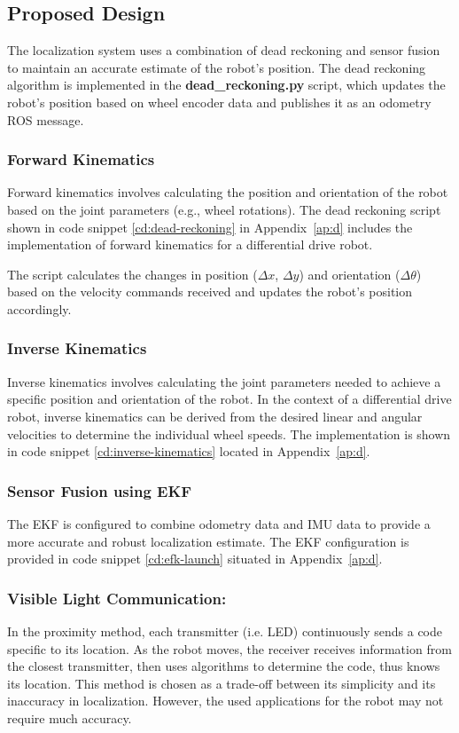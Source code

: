 \subsection{Proposed Design}
The localization system uses a combination of dead reckoning and sensor fusion to maintain an accurate estimate of the robot's position. The dead reckoning algorithm is implemented in the \textbf{dead\_reckoning.py} script, which updates the robot's position based on wheel encoder data and publishes it as an odometry ROS message.

\subsubsection{Forward Kinematics}
Forward kinematics involves calculating the position and orientation of the robot based on the joint parameters (e.g., wheel rotations). The dead reckoning script shown in code snippet \ref{cd:dead-reckoning} in Appendix~\ref{ap:d} includes the implementation of forward kinematics for a differential drive robot.


The script calculates the changes in position ($\Delta x$, $\Delta y$) and orientation ($\Delta \theta$) based on the velocity commands received and updates the robot's position accordingly.

\subsubsection{Inverse Kinematics}
Inverse kinematics involves calculating the joint parameters needed to achieve a specific position and orientation of the robot. In the context of a differential drive robot, inverse kinematics can be derived from the desired linear and angular velocities to determine the individual wheel speeds. The implementation is shown in code snippet \ref{cd:inverse-kinematics} located in Appendix~\ref{ap:d}.


\subsubsection{Sensor Fusion using EKF}
The EKF is configured to combine odometry data and IMU data to provide a more accurate and robust localization estimate. The EKF configuration is provided in code snippet \ref{cd:efk-launch} situated in Appendix~\ref{ap:d}.

\subsubsection{Visible Light Communication:}
In the proximity method, each transmitter (i.e. LED) continuously sends a code specific to its location. As the robot moves, the receiver receives information from the closest transmitter, then uses algorithms to determine the code, thus knows its location. This method is chosen as a trade-off between its simplicity and its inaccuracy in localization. However, the used applications for the robot may not require much accuracy.
\cite{vlp} \cite{indoor-vlp}

